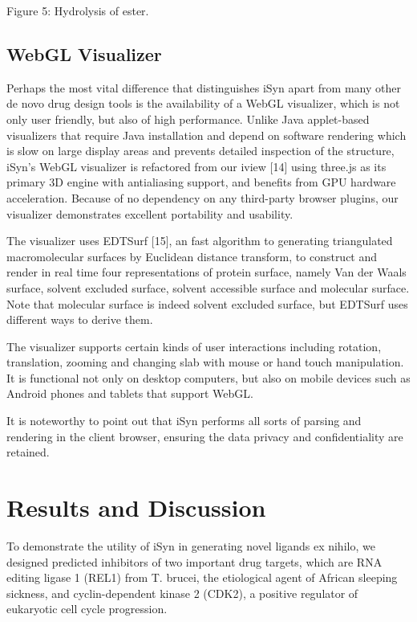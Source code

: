 Figure 5: Hydrolysis of ester.

\subsection{WebGL Visualizer}

Perhaps the most vital difference that distinguishes iSyn apart from many other de novo drug design tools is the availability of a WebGL visualizer, which is not only user friendly, but also of high performance. Unlike Java applet-based visualizers that require Java installation and depend on software rendering which is slow on large display areas and prevents detailed inspection of the structure, iSyn’s WebGL visualizer is refactored from our iview [14] using three.js as its primary 3D engine with antialiasing support, and benefits from GPU hardware acceleration. Because of no dependency on any third-party browser plugins, our visualizer demonstrates excellent portability and usability.

The visualizer uses EDTSurf [15], an fast algorithm to generating triangulated macromolecular surfaces by Euclidean distance transform, to construct and render in real time four representations of protein surface, namely Van der Waals surface, solvent excluded surface, solvent accessible surface and molecular surface. Note that molecular surface is indeed solvent excluded surface, but EDTSurf uses different ways to derive them.

The visualizer supports certain kinds of user interactions including rotation, translation, zooming and changing slab with mouse or hand touch manipulation. It is functional not only on desktop computers, but also on mobile devices such as Android phones and tablets that support WebGL.

It is noteworthy to point out that iSyn performs all sorts of parsing and rendering in the client browser, ensuring the data privacy and confidentiality are retained.

\section{Results and Discussion}

To demonstrate the utility of iSyn in generating novel ligands ex nihilo, we designed predicted inhibitors of two important drug targets, which are RNA editing ligase 1 (REL1) from T. brucei, the etiological agent of African sleeping sickness, and cyclin-dependent kinase 2 (CDK2), a positive regulator of eukaryotic cell cycle progression.

